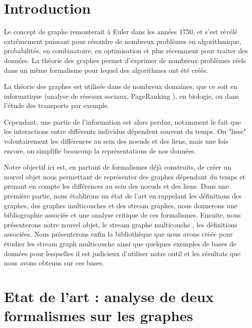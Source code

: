 \documentclass[11pt,a4paper]{article}
\theoremstyle{definition}
\theoremstyle{remark}
\theoremstyle{remark}
\begin{document}

\begin{abstract}

\end{abstract}

\newpage 

\tableofcontents
\newpage



\section*{Introduction}
	Le concept de graphe remonterait à Euler \cite{wikigraphes,divin} dans les années 1750, et s'est révélé extrêmement puissant pour résoudre de nombreux problèmes en algorithmique, probabilités, en combinatoire, en optimisation et plus récemment pour traiter des données.
	La théorie des graphes permet d'exprimer de nombreux problèmes réels dans un même formalisme pour lequel des algorithmes ont été créés.
	
	La théorie des graphes est utilisée dans de nombreux domaines, que ce soit en informatique (analyse de réseaux sociaux, PageRanking \cite{pr}), en biologie, ou dans l'étude des transports par exemple.
	
	Cependant, une partie de l'information est alors perdue, notamment le fait que les interactions entre différents individus dépendent souvent du temps. On "lisse" volontairement les différences au sein des noeuds et des liens, mais une fois encore, on simplifie beaucoup la représentations de nos données.
	
	Notre objectif ici est, en partant de formalismes déjà construits, de créer un nouvel objet nous permettant de représenter des graphes dépendant du temps et prenant en compte les différences au sein des noeuds et des liens. Dans une première partie, nous établirons un état de l'art en rappelant les définitions des graphes, des graphes multicouches et des stream graphes, nous donnerons une bibliographie associée et une analyse critique de ces formalismes. Ensuite, nous présenterons notre nouvel objet, le \og stream graphe multicouche \fg , les définitions associées.
	Nous présenterons enfin la bibliothèque que nous avons créée pour étudier les stream graph multicouche ainsi que quelques exemples de bases de données pour lesquelles il est judicieux d'utiliser notre outil et les résultats que nous avons obtenus sur ces bases. 
	
	
	
\section{Etat de l'art : analyse de deux formalismes sur les graphes}
\indent
\end{document}
